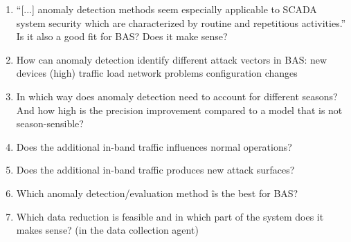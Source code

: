 \begin{enumerate}
	\item \enquote{[...] anomaly detection methods seem especially applicable to SCADA system security which are characterized by routine and repetitious activities.} \parencite{Yang2006} Is it also a good fit for BAS? Does it make sense?
	\item How can anomaly detection identify different attack vectors in BAS:
		\subitem new devices
		\subitem (high) traffic load
		\subitem network problems
		\subitem configuration changes
	\item In which way does anomaly detection need to account for different seasons? And how high is the precision improvement compared to a model that is not season-sensible?
	\item Does the additional in-band traffic influences normal operations?
	\item Does the additional in-band traffic produces new attack surfaces?
	\item Which anomaly detection/evaluation method îs the best for BAS?
	\item Which data reduction is feasible and in which part of the system does it makes sense? (in the data collection agent)
\end{enumerate}